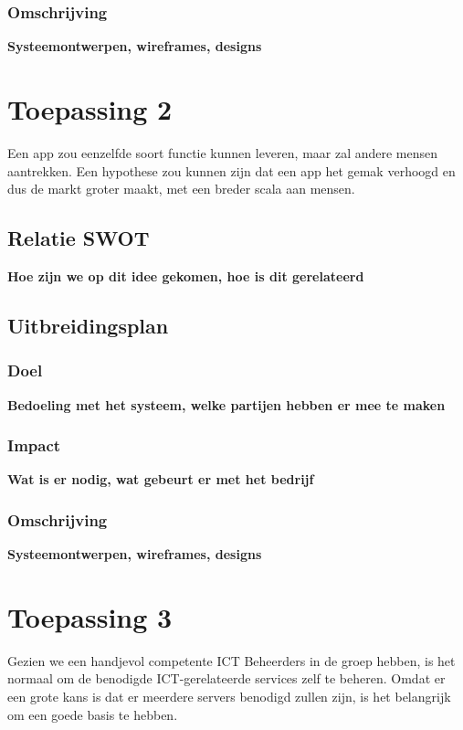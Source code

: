 \subsubsection{Omschrijving}
{\bf Systeemontwerpen, wireframes, designs}

\section{Toepassing 2}

Een app zou eenzelfde soort functie kunnen leveren,
maar zal andere mensen aantrekken.
Een hypothese zou kunnen zijn dat een app het gemak verhoogd
en dus de markt groter maakt,
met een breder scala aan mensen.

\subsection{Relatie SWOT}
{\bf Hoe zijn we op dit idee gekomen, hoe is dit gerelateerd}

\subsection{Uitbreidingsplan}

\subsubsection{Doel}
{\bf Bedoeling met het systeem, welke partijen hebben er mee te maken}

\subsubsection{Impact}
{\bf Wat is er nodig, wat gebeurt er met het bedrijf}

\subsubsection{Omschrijving}
{\bf Systeemontwerpen, wireframes, designs}

\section{Toepassing 3}

Gezien we een handjevol competente ICT Beheerders in de groep hebben,
is het normaal om de benodigde ICT-gerelateerde services zelf te beheren.
Omdat er een grote kans is dat er meerdere servers benodigd zullen zijn,
is het belangrijk om een goede basis te hebben.

